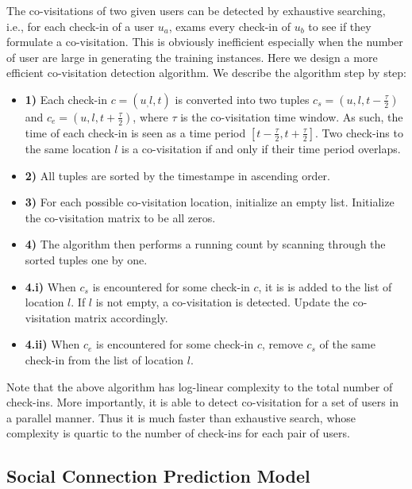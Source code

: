  The co-visitations of two given users can be detected by exhaustive searching, i.e., for each check-in of a user $u_a$, exams every check-in of $u_b$ to see if they formulate a co-visitation. This is obviously inefficient especially when the number of user are large in generating the training instances. Here we design a more efficient co-visitation detection algorithm. We describe the algorithm step by step:
\begin{itemize}[leftmargin=*]
\item \textbf{1)} Each check-in $c = (u_, l, t)$ is converted into two tuples $c_s = (u, l, t- \frac{\tau}{2})$ and $c_e = (u, l, t+\frac{\tau}{2})$, where $\tau$ is the co-visitation time window. As such, the time of each check-in is seen as a time period $[t - \frac{\tau}{2}, t + \frac{\tau}{2}]$. Two check-ins to the same location $l$ is a co-visitation if and only if their time period overlaps.
\item \textbf{2)} All tuples are sorted by the timestampe in ascending order.
\item \textbf{3)} For each possible co-visitation location, initialize an empty list. Initialize the co-visitation matrix to be all zeros.
\item \textbf{4)} The algorithm then performs a running count by scanning through the sorted tuples one by one.
\item \textbf{4.i)} When $c_s$ is encountered for some check-in $c$, it is is added to the list of location $l$. If $l$ is not empty, a co-visitation is detected. Update the co-visitation matrix accordingly.
\item \textbf{4.ii)} When $c_e$ is encountered for some check-in $c$, remove $c_s$ of the same check-in from the list of location $l$.
\end{itemize} 
Note that the above algorithm has log-linear complexity to the total number of check-ins. More importantly, it is able to detect co-visitation for a set of users in a parallel manner. Thus it is much faster than exhaustive search, whose complexity is quartic to the number of check-ins for each pair of users.



\subsection{Social Connection Prediction Model}

